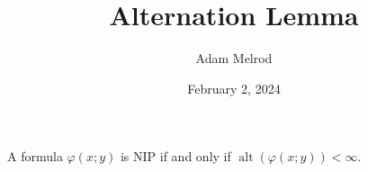 \documentclass[a4paper]{article}
\title{Alternation Lemma}
\date{February 2, 2024}
\author{Adam Melrod}
\begin{document}
\maketitle
\par{A formula \(\varphi (x;y)\) is NIP if and only if \(\operatorname {alt}( \varphi (x;y)) <  \infty\).}
\printbibliography
\end{document}
